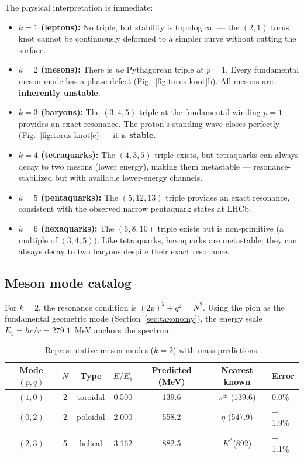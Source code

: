 \documentclass[11pt,a4paper]{article}
\begin{document}
The physical interpretation is immediate:
\begin{itemize}
  \item \textbf{$k=1$ (leptons):} No triple, but stability is topological --- the $(2,1)$ torus knot cannot be continuously deformed to a simpler curve without cutting the surface.
  \item \textbf{$k=2$ (mesons):} There is \emph{no} Pythagorean triple at $p=1$. Every fundamental meson mode has a phase defect (Fig.~\ref{fig:torus-knot}b). All mesons are \textbf{inherently unstable}.
  \item \textbf{$k=3$ (baryons):} The $(3,4,5)$ triple at the fundamental winding $p=1$ provides an exact resonance. The proton's standing wave closes perfectly (Fig.~\ref{fig:torus-knot}c) --- it is \textbf{stable}.
  \item \textbf{$k=4$ (tetraquarks):} The $(4,3,5)$ triple exists, but tetraquarks can always decay to two mesons (lower energy), making them metastable --- resonance-stabilized but with available lower-energy channels.
  \item \textbf{$k=5$ (pentaquarks):} The $(5,12,13)$ triple provides an exact resonance, consistent with the observed narrow pentaquark states at LHCb.
  \item \textbf{$k=6$ (hexaquarks):} The $(6,8,10)$ triple exists but is non-primitive (a multiple of $(3,4,5)$). Like tetraquarks, hexaquarks are metastable: they can always decay to two baryons despite their exact resonance.
\end{itemize}

\subsection{Meson mode catalog}

For $k=2$, the resonance condition is $(2p)^2 + q^2 = N^2$. Using the pion as the fundamental geometric mode (Section~\ref{sec:taxonomy}), the energy scale $E_1 = \hbar c/r = 279.1$~MeV anchors the spectrum.

\begin{table}[h]
\centering
\caption{Representative meson modes ($k=2$) with mass predictions.}
\label{tab:meson-modes}
\begin{tabular}{@{}ccccccl@{}}
\toprule
Mode $(p,q)$ & $N$ & Type & $E/E_1$ & Predicted (MeV) & Nearest known & Error \\
\midrule
$(1,0)$ & 2 & toroidal & 0.500 & 139.6 & $\pi^\pm$ (139.6) & 0.0\% \\
$(0,2)$ & 2 & poloidal & 2.000 & 558.2 & $\eta$ (547.9) & $+$1.9\% \\
$(2,3)$ & 5 & helical & 3.162 & 882.5 & $K^*$(892) & $-$1.1\% \\
\bottomrule
\end{tabular}
\end{table}
\end{document}
